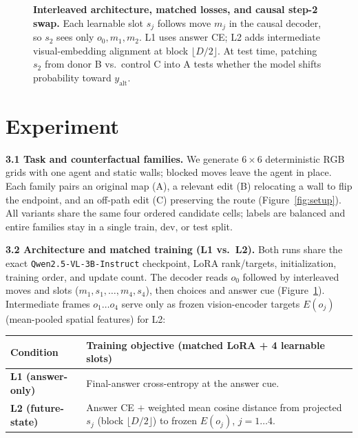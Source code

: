 \documentclass{article}
\begin{document}
\begin{figure}[t!]
{%
}
\caption{\textbf{Interleaved architecture, matched losses, and causal step-2 swap.} Each learnable slot $s_j$ follows move $m_j$ in the causal decoder, so $s_2$ sees only $o_0, m_1, m_2$. L1 uses answer CE; L2 adds intermediate visual-embedding alignment at block $\lfloor D/2 \rfloor$. At test time, patching $s_2$ from donor B vs.\ control C into A tests whether the model shifts probability toward $y_{\text{alt}}$.}
\label{fig:arch}
\end{figure}

\section{Experiment}

\textbf{3.1 Task and counterfactual families.} We generate $6\times6$ deterministic RGB grids with one agent and static walls; blocked moves leave the agent in place. Each family pairs an original map (A), a relevant edit (B) relocating a wall to flip the endpoint, and an off-path edit (C) preserving the route (Figure~\ref{fig:setup}). All variants share the same four ordered candidate cells; labels are balanced and entire families stay in a single train, dev, or test split.

\textbf{3.2 Architecture and matched training (L1 vs.\ L2).} Both runs share the exact \texttt{Qwen2.5-VL-3B-Instruct} checkpoint, LoRA rank/targets, initialization, training order, and update count. The decoder reads $o_0$ followed by interleaved moves and slots ($m_1, s_1, \ldots, m_4, s_4$), then choices and answer cue (Figure~\ref{fig:arch}). Intermediate frames $o_1\dots o_4$ serve only as frozen vision-encoder targets $E(o_j)$ (mean-pooled spatial features) for L2:

\vspace{1pt}
\noindent\begin{tabular}{@{}lp{9.6cm}@{}}
\toprule
\textbf{Condition} & \textbf{Training objective (matched LoRA + 4 learnable slots)} \\
\midrule
\textbf{L1 (answer-only)} & Final-answer cross-entropy at the answer cue. \\
\textbf{L2 (future-state)} & Answer CE $+$ weighted mean cosine distance from projected $s_j$ (block $\lfloor D/2 \rfloor$) to frozen $E(o_j)$, $j{=}1{\dots}4$. \\
\bottomrule
\end{tabular}
\vspace{1pt}
\end{document}
